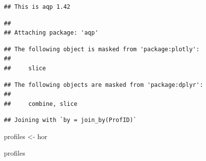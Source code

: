 \documentclass[
  10pt,
  b5paper,
  oneside]{book}
\newenvironment{Shaded}{\begin{snugshade}}{\end{snugshade}}
\newcommand{\FunctionTok}[1]{\textcolor[rgb]{0.00,0.00,0.00}{#1}}
\newcommand{\NormalTok}[1]{#1}
\newcommand{\OtherTok}[1]{\textcolor[rgb]{0.56,0.35,0.01}{#1}}
\newcommand{\SpecialCharTok}[1]{\textcolor[rgb]{0.00,0.00,0.00}{#1}}
\begin{document}
\begin{verbatim}
## This is aqp 1.42
\end{verbatim}

\begin{verbatim}
## 
## Attaching package: 'aqp'
\end{verbatim}

\begin{verbatim}
## The following object is masked from 'package:plotly':
## 
##     slice
\end{verbatim}

\begin{verbatim}
## The following objects are masked from 'package:dplyr':
## 
##     combine, slice
\end{verbatim}

\begin{Shaded}
\end{Shaded}

\begin{verbatim}
## Joining with `by = join_by(ProfID)`
\end{verbatim}

\begin{Shaded}
\begin{Highlighting}[]
\NormalTok{profiles }\OtherTok{\textless{}{-}}\NormalTok{ hor}

\NormalTok{profiles}
\end{Highlighting}
\end{Shaded}
\end{document}
